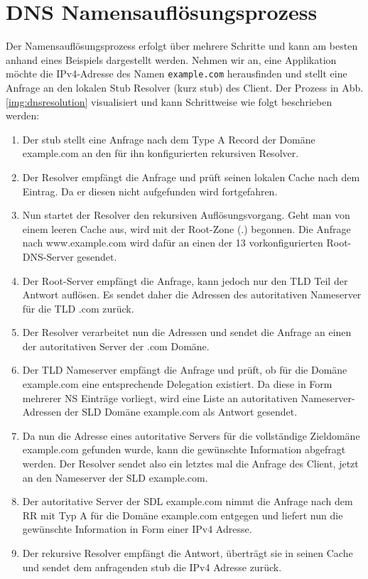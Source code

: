 \section{DNS Namensauflösungsprozess}
\label{sec:dnsresolution}

Der Namensauflösungsprozess erfolgt über mehrere Schritte und kann am besten anhand eines Beispiels dargestellt werden. Nehmen wir an, eine Applikation möchte die IPv4-Adresse des Namen \texttt{example.com} herausfinden und stellt eine Anfrage an den lokalen Stub Resolver (kurz stub) des Client. Der Prozess in Abb. \ref{img:dnsresolution} visualisiert und kann Schrittweise wie folgt beschrieben werden:

\begin{enumerate}
    \item Der stub stellt eine Anfrage nach dem Type A Record der Domäne example.com an den für ihn konfigurierten rekursiven Resolver.
    \item Der Resolver empfängt die Anfrage und prüft seinen lokalen Cache nach dem Eintrag. Da er diesen nicht aufgefunden wird fortgefahren.
    \item Nun startet der Resolver den rekursiven Auflösungsvorgang. Geht man von einem leeren Cache aus, wird mit der Root-Zone (.) begonnen. Die Anfrage nach www.example.com wird dafür an einen der 13 vorkonfigurierten Root-DNS-Server gesendet.
    \item Der Root-Server empfängt die Anfrage, kann jedoch nur den TLD Teil der Antwort auflösen. Es sendet daher die Adressen des autoritativen Nameserver für die TLD .com zurück.
    \item Der Resolver verarbeitet nun die Adressen und sendet die Anfrage an einen der autoritativen Server der .com Domäne.
    \item Der TLD Nameserver empfängt die Anfrage und prüft, ob für die Domäne example.com eine entsprechende Delegation existiert. Da diese in Form mehrerer NS Einträge vorliegt, wird eine Liste an autoritativen Nameserver-Adressen der SLD Domäne example.com als Antwort gesendet.
    \item Da nun die Adresse eines autoritative Servers für die vollständige Zieldomäne example.com gefunden wurde, kann die gewünschte Information abgefragt werden. Der Resolver sendet also ein letztes mal die Anfrage des Client, jetzt an den Nameserver der SLD example.com.
    \item Der autoritative Server der SDL example.com nimmt die Anfrage nach dem RR mit Typ A für die Domäne example.com entgegen und liefert nun die gewünschte Information in Form einer IPv4 Adresse.
    \item Der rekursive Resolver empfängt die Antwort, überträgt sie in seinen Cache und sendet dem anfragenden stub die IPv4 Adresse zurück.
\end{enumerate}

